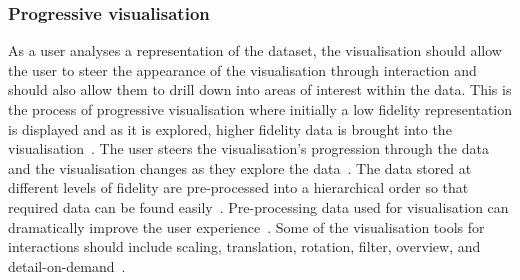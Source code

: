 \subsubsection{Progressive visualisation}
As a user analyses a representation of the dataset, the visualisation should allow the user to steer the appearance of the visualisation through interaction and should also allow them to drill down into areas of interest within the data.
This is the process of progressive visualisation where initially a low fidelity representation is displayed and as it is explored, higher fidelity data is brought into the visualisation~\cite{Zhao2017, Ahrens2005, Rosenbaum2009, Li2016, Tufte1983}.
The user steers the visualisation's progression through the data and the visualisation changes as they explore the data~\cite{Zhao2017, Muhlbacher2014, Fisher2012}.
The data stored at different levels of fidelity are pre-processed into a hierarchical order so that required data can be found easily~\cite{Glueck2014}.
Pre-processing data used for visualisation can dramatically improve the user experience~\cite{Shneiderman2008}.
Some of the visualisation tools for interactions should include scaling, translation, rotation, filter, overview, and detail-on-demand~\cite{Zhao2017, Becker1987, Sneiderman1996, keim1997, Baracaglia2019, Ferrand2016}. 


